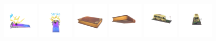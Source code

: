 \begin{figure}[htbp]
  \includegraphics[width=0.15\textwidth]{images/data/samples/10.1.jpeg}\hspace{0.01\textwidth}%
  \includegraphics[width=0.15\textwidth]{images/data/samples/10.2.jpeg}\hfill
  \includegraphics[width=0.15\textwidth]{images/data/samples/11.1.jpeg}\hspace{0.01\textwidth}%
  \includegraphics[width=0.15\textwidth]{images/data/samples/11.2.jpeg}\hfill
  \includegraphics[width=0.15\textwidth]{images/data/samples/12.1.jpeg}\hspace{0.01\textwidth}%
  \includegraphics[width=0.15\textwidth]{images/data/samples/12.2.jpeg}\\
  \vspace{2mm}


\end{figure}
